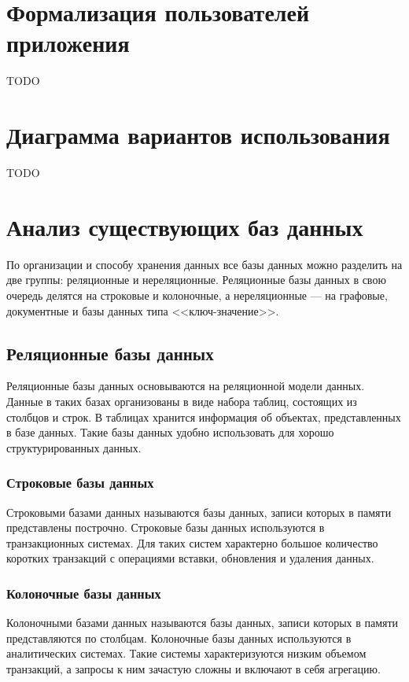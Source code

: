 \section{Формализация пользователей приложения}

TODO

\section{Диаграмма вариантов использования}

TODO

\section{Анализ существующих баз данных}

По организации и способу хранения данных все базы данных можно разделить на две группы: реляционные и нереляционные. Реляционные базы данных в свою очередь делятся на строковые и колоночные, а нереляционные --- на графовые, документные и базы данных типа <<ключ-значение>>.

\subsection{Реляционные базы данных}

Реляционные базы данных основываются на реляционной модели данных. Данные в таких базах организованы в виде набора таблиц, состоящих из столбцов и строк. В таблицах хранится информация об объектах, представленных в базе данных. Такие базы данных удобно использовать для хорошо структурированных данных.

\subsubsection{Строковые базы данных}

Строковыми базами данных называются базы данных, записи которых в памяти представлены построчно. Строковые базы данных используются в транзакционных системах. Для таких систем характерно большое количество коротких транзакций с операциями вставки, обновления и удаления данных.

\subsubsection{Колоночные базы данных}

Колоночными базами данных называются базы данных, записи которых в памяти представляются по столбцам. Колоночные базы данных используются в аналитических системах. Такие системы характеризуются низким объемом транзакций, а запросы к ним зачастую сложны и включают в себя агрегацию.

